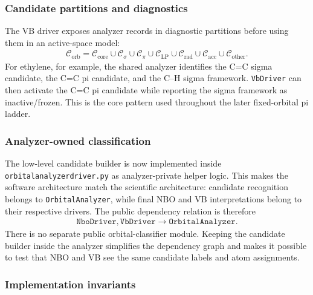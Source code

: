 \documentclass[11pt]{article}
\begin{document}
\subsubsection*{Candidate partitions and diagnostics}

The VB driver exposes analyzer records in diagnostic partitions before using them in an active-space model:
\begin{equation}
\begin{aligned}
	\mathcal{C}_{\mathrm{orb}}
	= \mathcal{C}_{\mathrm{core}}
	\cup \mathcal{C}_{\sigma}
	\cup \mathcal{C}_{\pi}
	\cup \mathcal{C}_{\mathrm{LP}}
	\cup \mathcal{C}_{\mathrm{rad}}
	\cup \mathcal{C}_{\mathrm{acc}}
	\cup \mathcal{C}_{\mathrm{other}}.
\end{aligned}
\end{equation}
For ethylene, for example, the shared analyzer identifies the C=C sigma candidate, the C=C pi candidate, and the C--H sigma framework.  \texttt{VbDriver} can then activate the C=C pi candidate while reporting the sigma framework as inactive/frozen.  This is the core pattern used throughout the later fixed-orbital pi ladder.

\subsubsection*{Analyzer-owned classification}

The low-level candidate builder is now implemented inside \texttt{orbitalanalyzerdriver.py} as analyzer-private helper logic.  This makes the software architecture match the scientific architecture: candidate recognition belongs to \texttt{OrbitalAnalyzer}, while final NBO and VB interpretations belong to their respective drivers.  The public dependency relation is therefore
\begin{equation}
\begin{aligned}
	\texttt{NboDriver},\texttt{VbDriver}
	\longrightarrow \texttt{OrbitalAnalyzer}.
\end{aligned}
\end{equation}
There is no separate public orbital-classifier module.  Keeping the candidate builder inside the analyzer simplifies the dependency graph and makes it possible to test that NBO and VB see the same candidate labels and atom assignments.

\subsubsection*{Implementation invariants}
\end{document}
